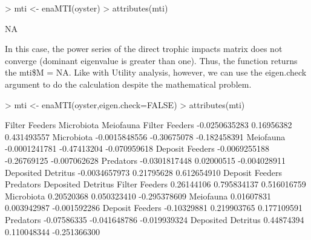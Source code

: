 \documentclass[article]{jss}
\begin{document}
\begin{Schunk}
\begin{Sinput}
> mti <- enaMTI(oyster)
> attributes(mti)
\end{Sinput}
\begin{Soutput}
[1] NA
\end{Soutput}
\end{Schunk}

In this case, the power series of the direct trophic impacts matrix
does not converge (dominant eigenvalue is greater than one).  Thus,
the function returns the mti\$M = NA.  Like with Utility analysis,
however, we can use the eigen.check argument to do the calculation
despite the mathematical problem.

\begin{Schunk}
\begin{Sinput}
> mti <- enaMTI(oyster,eigen.check=FALSE)
> attributes(mti)
\end{Sinput}
\begin{Soutput}
                   Filter Feeders  Microbiota    Meiofauna
Filter Feeders      -0.0250635283  0.16956382  0.431493557
Microbiota          -0.0015848556 -0.30675078 -0.182458391
Meiofauna           -0.0001241781 -0.47413204 -0.070959618
Deposit Feeders     -0.0069255188 -0.26769125 -0.007062628
Predators           -0.0301817448  0.02000515 -0.004028911
Deposited Detritus  -0.0034657973  0.21795628  0.612654910
                   Deposit Feeders    Predators Deposited Detritus
Filter Feeders          0.26144106  0.795834137        0.516016759
Microbiota              0.20520368  0.050323410       -0.295378609
Meiofauna               0.01607831  0.003942987       -0.001592286
Deposit Feeders        -0.10329881  0.219903765        0.177109591
Predators              -0.07586335 -0.041648786       -0.019939324
Deposited Detritus      0.44874394  0.110048344       -0.251366300
\end{Soutput}
\end{Schunk}
\end{document}
